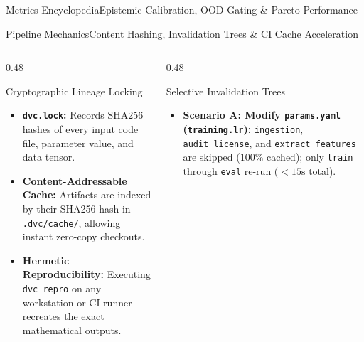 \begin{frame}{Metrics Encyclopedia}{Epistemic Calibration, OOD Gating \& Pareto Performance}
\end{frame}

\begin{frame}{Pipeline Mechanics}{Content Hashing, Invalidation Trees \& CI Cache Acceleration}
    \begin{columns}[T]
        \begin{column}{0.48\textwidth}
            \begin{block}{Cryptographic Lineage Locking}
                \begin{itemize}\scriptsize
                    \item \textbf{\texttt{dvc.lock}:} Records SHA256 hashes of every input code file, parameter value, and data tensor.
                    \item \textbf{Content-Addressable Cache:} Artifacts are indexed by their SHA256 hash in \texttt{.dvc/cache/}, allowing instant zero-copy checkouts.
                    \item \textbf{Hermetic Reproducibility:} Executing \texttt{dvc repro} on any workstation or CI runner recreates the exact mathematical outputs.
                \end{itemize}
            \end{block}
        \end{column}
        \begin{column}{0.48\textwidth}
            \begin{block}{Selective Invalidation Trees}
                \begin{itemize}\scriptsize
                    \item \textbf{Scenario A: Modify \texttt{params.yaml} (\texttt{training.lr}):}
                        \texttt{ingestion}, \texttt{audit\_license}, and \texttt{extract\_features} are skipped ($100\%$ cached); only \texttt{train} through \texttt{eval} re-run ($< 15\text{s}$ total).

\end{itemize}
\end{block}
\end{column}
\end{columns}
\end{frame}
